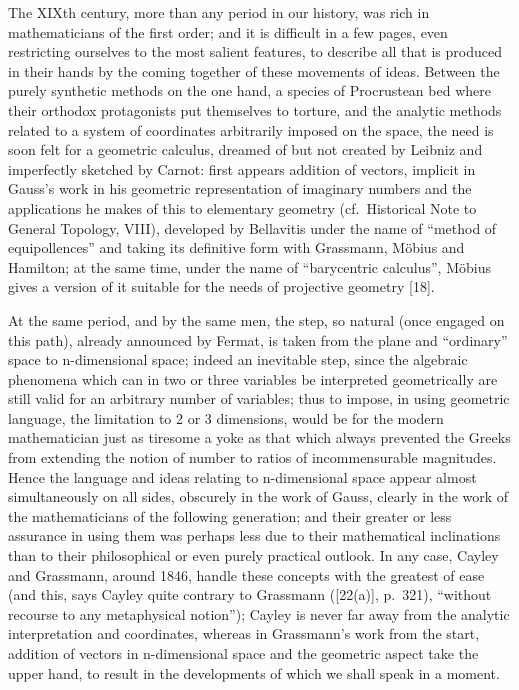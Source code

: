 The XIXth century, more than any period in our history, was rich in mathematicians of the first order; and it is difficult in a few pages, even restricting ourselves to the most salient features, to describe all that is produced in their hands by the coming together of these movements of ideas. Between the purely synthetic methods on the one hand, a species of Procrustean bed where their orthodox protagonists put themselves to torture, and the analytic methods related to a system of coordinates arbitrarily imposed on the space, the need is soon felt for a geometric calculus, dreamed of but not created by Leibniz and imperfectly sketched by Carnot: first appears addition of vectors, implicit in Gauss's work in his geometric representation of imaginary numbers and the applications he makes of this to elementary geometry (cf.~Historical Note to General Topology, VIII), developed by Bellavitis under the name of ``method of equipollences'' and taking its definitive form with Grassmann, Möbius and Hamilton; at the same time, under the name of ``barycentric calculus'', Möbius gives a version of it suitable for the needs of projective geometry {[}18{]}.

At the same period, and by the same men, the step, so natural (once engaged on this path), already announced by Fermat, is taken from the plane and ``ordinary'' space to n-dimensional space; indeed an inevitable step, since the algebraic phenomena which can in two or three variables be interpreted geometrically are still valid for an arbitrary number of variables; thus to impose, in using geometric language, the limitation to 2 or 3 dimensions, would be for the modern mathematician just as tiresome a yoke as that which always prevented the Greeks from extending the notion of number to ratios of incommensurable magnitudes. Hence the language and ideas relating to n-dimensional space appear almost simultaneously on all sides, obscurely in the work of Gauss, clearly in the work of the mathematicians of the following generation; and their greater or less assurance in using them was perhaps less due to their mathematical inclinations than to their philosophical or even purely practical outlook. In any case, Cayley and Grassmann, around 1846, handle these concepts with the greatest of ease (and this, says Cayley quite contrary to Grassmann ({[}22(a){]}, p.~321), ``without recourse to any metaphysical notion''); Cayley is never far away from the analytic interpretation and coordinates, whereas in Grassmann's work from the start, addition of vectors in n-dimensional space and the geometric aspect take the upper hand, to result in the developments of which we shall speak in a moment.

